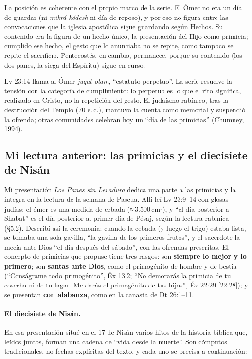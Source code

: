 \documentclass[11pt,letterpaper]{article}
\newcommand{\destacar}[1]{\textbf{\textcolor{tierraroja}{#1}}}
\begin{document}
La posición es coherente con el propio marco de la serie. El Ómer no era un día de guardar (ni \emph{mikrá kódesh} ni día de reposo), y por eso no figura entre las convocaciones que la iglesia apostólica sigue guardando según Hechos. Su contenido era la figura de un hecho único, la presentación del Hijo como primicia; cumplido ese hecho, el gesto que lo anunciaba no se repite, como tampoco se repite el sacrificio. Pentecostés, en cambio, permanece, porque su contenido (los dos panes, la siega del Espíritu) sigue en curso.

\begin{nota}
Lv 23:14 llama al Ómer \emph{juqat olam}, ``estatuto perpetuo''. La serie resuelve la tensión con la categoría de cumplimiento: lo perpetuo es lo que el rito significa, realizado en Cristo, no la repetición del gesto. El judaísmo rabínico, tras la destrucción del Templo (70 e.\,c.), mantuvo la cuenta como memorial y suspendió la ofrenda; otras comunidades celebran hoy un ``día de las primicias'' (Chumney, 1994).
\end{nota}

\subsection{Mi lectura anterior: las primicias y el diecisiete de Nisán}\label{sec:danilo}
Mi presentación \emph{Los Panes sin Levadura} dedica una parte a las primicias y la integra en la lectura de la semana de Pascua. Allí leí Lv 23:9--14 con glosas judías: el ómer es una medida de cebada (≈\,3.500\,cm³), y ``el día posterior a Shabat'' es el día posterior al primer día de Pésaj, según la lectura rabínica (§5.2). Describí así la ceremonia: cuando la cebada (y luego el trigo) estaba lista, se tomaba una sola gavilla, ``la gavilla de los primeros frutos'', y el sacerdote la mecía ante Dios ``el día después del sábado'', con las ofrendas prescritas. El concepto de primicias que propuse tiene tres rasgos: son \destacar{siempre lo mejor y lo primero}; son \destacar{santas ante Dios}, como el primogénito de hombre y de bestia (``Conságrame todo primogénito'', Éx 13:2; ``No demorarás la primicia de tu cosecha ni de tu lagar. Me darás el primogénito de tus hijos'', Éx 22:29 [22:28]); y se presentan \destacar{con alabanza}, como en la canasta de Dt 26:1--11.

\paragraph{El diecisiete de Nisán.} En esa presentación situé en el 17 de Nisán varios hitos de la historia bíblica que, leídos juntos, forman una cadena de ``vida desde la muerte''. Son cómputos tradicionales, no fechas explícitas del texto, y cada uno se precisa a continuación:
\end{document}

